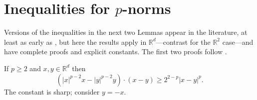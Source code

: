 \documentclass[final,onefignum]{siamart190516}
\newcommand\RR{\mathbb{R}}
\begin{document}




\appendix

\section{Inequalities for $p$-norms}   \label{app:pinequalities}  Versions of the inequalities in the next two Lemmas appear in the literature, at least as early as \cite{GlowinskiMarroco1975}, but here the results apply in $\RR^d$---contrast \cite{BarrettLiu1993,GlowinskiMarroco1975} for the $\RR^2$ case---and have complete proofs and explicit constants.  The first two proofs follow \cite[Appendix A]{Peral1997}.

\begin{lemma}  \label{lem:pbiginequality}  If $p\ge 2$ and $x,y\in\RR^d$ then
\begin{equation}
\left(|x|^{p-2} x - |y|^{p-2} y\right)\cdot(x-y) \ge 2^{2-p} |x-y|^p. \label{eq:pbiginequality}
\end{equation}
The constant is sharp; consider $y=-x$.
\end{lemma}
\end{document}
